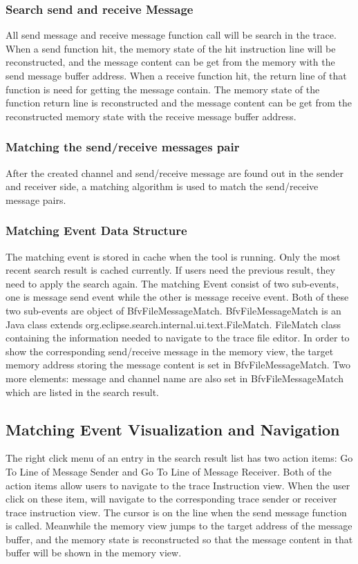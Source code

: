 \documentclass[paper=a4, fontsize=11pt]{scrartcl}
\numberwithin{equation}{section}		%
\numberwithin{figure}{section}			%
\numberwithin{table}{section}				%
\begin{document}
\subsubsection{Search send and receive Message}
All send message and receive message function call will be search in the trace. When a send function hit, the memory state of the hit instruction line will be reconstructed, and the message content can be get from the memory with the send message buffer address. When a receive function hit, the return line of that function is need for getting the message contain. The memory state of the function return line is reconstructed and the message content can be get  from the reconstructed memory state with the receive message buffer address.
\subsubsection{Matching the send/receive messages pair}
After the created channel and send/receive message are found out in the sender and receiver side, a matching algorithm is used to match the send/receive message pairs.
\subsubsection{Matching Event Data Structure}
The matching event is stored in cache when the tool is running. Only the most recent search result is cached currently. If users need the previous result, they need to apply the search again. The matching Event consist of two sub-events, one is message send event while the other is message receive event. Both of these two sub-events are object of BfvFileMessageMatch. BfvFileMessageMatch is an Java class extends org.eclipse.search.internal.ui.text.FileMatch. FileMatch class containing the information needed to navigate to the trace file editor. In order to show the corresponding send/receive message in the memory view, the target memory address storing the message content is set in BfvFileMessageMatch. Two more elements: message and channel name are also set in BfvFileMessageMatch which are listed in the search result. 

\subsection{Matching Event Visualization and Navigation}
The right click menu of an entry in the search result list has two action items: Go To Line of Message Sender and Go To Line of Message Receiver. Both of the action items allow users to navigate to the trace Instruction view. When the user click on these item, will navigate to the corresponding trace sender or receiver trace instruction view. The cursor is on the line when the send message function is called. Meanwhile the memory view jumps to the target address of the message buffer, and the memory state is reconstructed so that the message content in that buffer will be shown in the memory view.
\end{document}
